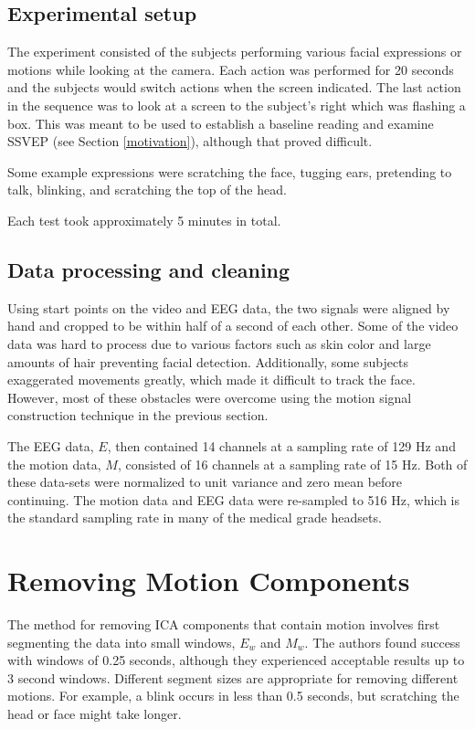 \documentclass{acm_proc_article-sp}
\begin{document}
\subsection{Experimental setup}
The experiment consisted of the subjects performing various facial
expressions or motions while looking at the camera. Each action was
performed for 20 seconds and the subjects would switch actions when
the screen indicated. The last action in the sequence was to look at a
screen to the subject's right which was flashing a box. This was meant
to be used to establish a baseline reading and examine SSVEP (see
Section \ref{motivation}), although that proved difficult.

Some example expressions were scratching the face, tugging ears,
pretending to talk, blinking, and scratching the top of the head.

Each test took approximately 5 minutes in total.

\subsection{Data processing and cleaning}
Using start points on the video and EEG data, the two signals were
aligned by hand and cropped to be within half of a second of each
other. Some of the video data was hard to process due to
various factors such as skin color and large amounts of hair
preventing facial detection. Additionally, some subjects
exaggerated movements greatly, which made it difficult to track the
face. However, most of these obstacles were overcome using the motion
signal construction technique in the previous section.

The EEG data, $E$, then contained 14 channels at a sampling rate of 129 Hz
and the motion data, $M$, consisted of 16 channels at a sampling rate of 15
Hz. Both of these data-sets were normalized to unit variance and zero
mean before continuing. The motion data and EEG data were
re-sampled to 516 Hz, which is the standard sampling rate in many of
the medical grade headsets.

\section{Removing Motion Components}
The method for removing ICA components that contain motion involves
first segmenting the data into small windows, $E_w$ and $M_w$. The
authors found success with windows of 0.25 seconds, although they
experienced acceptable results up to 3 second
windows. Different segment sizes are appropriate for removing
different motions. For example, a blink occurs in less than 0.5 seconds, but
scratching the head or face might take longer.
\end{document}
